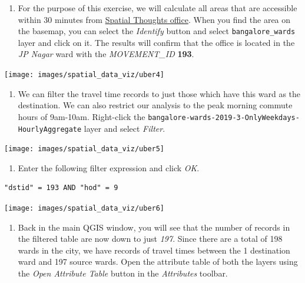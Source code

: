 \documentclass[
  12pt,
  a4paper]{article}
\providecommand{\tightlist}{%
  \setlength{\itemsep}{0pt}\setlength{\parskip}{0pt}}
\begin{document}
\begin{enumerate}
\def\labelenumi{\arabic{enumi}.}
\setcounter{enumi}{3}
\tightlist
\item
  For the purpose of this exercise, we will calculate all areas that are
  accessible within 30 minutes from
  \href{https://g.page/spatialthoughts?share}{Spatial Thoughts office}.
  When you find the area on the basemap, you can select the
  \emph{Identify} button and select \texttt{bangalore\_wards} layer and
  click on it. The results will confirm that the office is located in
  the \emph{JP Nagar} ward with the \emph{MOVEMENT\_ID} \textbf{193}.
\end{enumerate}

\begin{center}\texttt{[image: images/spatial\_data\_viz/uber4]} \end{center}

\begin{enumerate}
\def\labelenumi{\arabic{enumi}.}
\setcounter{enumi}{4}
\tightlist
\item
  We can filter the travel time records to just those which have this
  ward as the destination. We can also restrict our analysis to the peak
  morning commute hours of 9am-10am. Right-click the
  \texttt{bangalore-wards-2019-3-OnlyWeekdays-HourlyAggregate} layer and
  select \emph{Filter}.
\end{enumerate}

\begin{center}\texttt{[image: images/spatial\_data\_viz/uber5]} \end{center}

\begin{enumerate}
\def\labelenumi{\arabic{enumi}.}
\setcounter{enumi}{5}
\tightlist
\item
  Enter the following filter expression and click \emph{OK}.
\end{enumerate}

\begin{verbatim}
"dstid" = 193 AND "hod" = 9
\end{verbatim}

\begin{center}\texttt{[image: images/spatial\_data\_viz/uber6]} \end{center}

\begin{enumerate}
\def\labelenumi{\arabic{enumi}.}
\setcounter{enumi}{6}
\tightlist
\item
  Back in the main QGIS window, you will see that the number of records
  in the filtered table are now down to just \emph{197}. Since there are
  a total of 198 wards in the city, we have records of travel times
  between the 1 destination ward and 197 source wards. Open the
  attribute table of both the layers using the \emph{Open Attribute
  Table} button in the \emph{Attributes} toolbar.
\end{enumerate}
\end{document}
